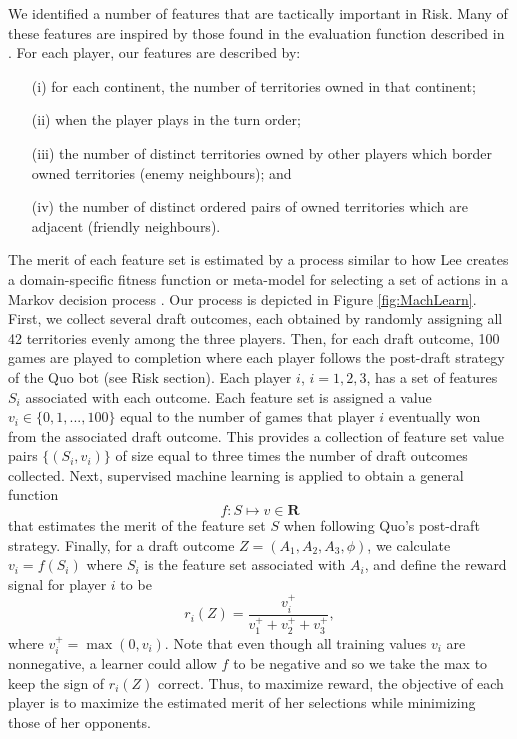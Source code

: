 \documentclass[letterpaper]{article}
\numberwithin{equation}{section}
\numberwithin{theorem}{section}
\numberwithin{lemma}{section}
\numberwithin{df}{section}
\begin{document}
We identified a number of features that are tactically important in Risk.  Many of these features are inspired by those found in the evaluation function described in \cite{RiskBots}.  For each player, our features are described by:
\begin{itemize}
	\item[(i)] for each continent, the number of territories owned in that continent;
	\item[(ii)] when the player plays in the turn order;
	\item[(iii)] the number of distinct territories owned by other players which border owned territories (enemy neighbours); and
	\item[(iv)] the number of distinct ordered pairs of owned territories which are adjacent (friendly neighbours).
\end{itemize}
The merit of each feature set is estimated by a process similar to how Lee creates a domain-specific fitness function or meta-model for selecting a set of actions in a Markov decision process \cite{GregLeeThesis}.  Our process is depicted in Figure \ref{fig:MachLearn}.  First, we collect several draft outcomes, each obtained by randomly assigning all 42 territories evenly among the three players.  Then, for each draft outcome, 100 games are played to completion where each player follows the post-draft strategy of the Quo bot (see Risk section).  Each player $i$, $i=1,2,3$, has a set of features $S_i$ associated with each outcome.  Each feature set is assigned a value $v_i \in \{0,1,...,100\}$ equal to the number of games that player $i$ eventually won from the associated draft outcome.  This provides a collection of feature set value pairs $\{(S_i, v_i)\}$ of size equal to three times the number of draft outcomes collected.  Next, supervised machine learning is applied to obtain a general function
\[ f: S \mapsto v \in \textbf{R} \] 
that estimates the merit of the feature set $S$ when following Quo's post-draft strategy.  Finally, for a draft outcome $Z = (A_1,A_2,A_3,\phi)$, we calculate $v_i = f(S_i)$ where $S_i$ is the feature set associated with $A_i$, and define the reward signal for player $i$ to be
\[ r_i(Z) = \frac{v_i^+}{v_1^+ + v_2^+ + v_3^+}, \]
where $v_i^+ = \max(0, v_i)$.  Note that even though all training values $v_i$ are nonnegative, a learner could allow $f$ to be negative and so we take the max to keep the sign of $r_i(Z)$ correct.  Thus, to maximize reward, the objective of each player is to maximize the estimated merit of her selections while minimizing those of her opponents.
\end{document}
